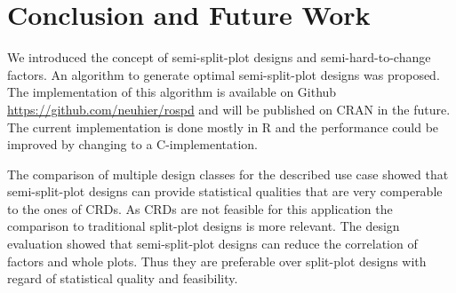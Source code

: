 \section{Conclusion and Future Work} \label{summary}

We introduced the concept of semi-split-plot designs and semi-hard-to-change factors. An algorithm to generate optimal semi-split-plot designs was proposed. The implementation of this algorithm is available on Github \url{https://github.com/neuhier/rospd} and will be published on CRAN in the future. The current implementation is done mostly in R and the performance could be improved by changing to a C-implementation. 

The comparison of multiple design classes for the described use case showed that semi-split-plot designs can provide statistical qualities that are very comperable to the ones of CRDs. As CRDs are not feasible for this application the comparison to traditional split-plot designs is more relevant. The design evaluation showed that semi-split-plot designs can reduce the correlation of factors and whole plots. Thus they are preferable over split-plot designs with regard of statistical quality and feasibility. 